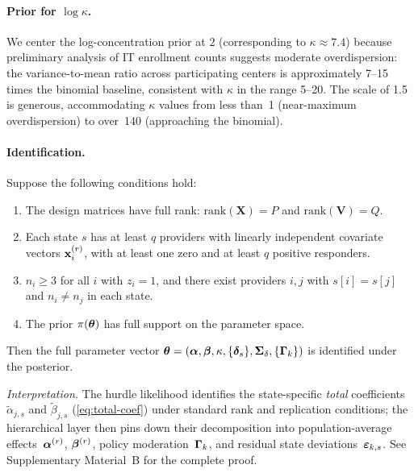 \paragraph{Prior for $\log\kappa$.}
We center the log-concentration prior at $2$ (corresponding to $\kappa \approx 7.4$)
because preliminary analysis of IT enrollment counts suggests moderate
overdispersion: the variance-to-mean ratio across participating centers is
approximately 7--15 times the binomial baseline, consistent with $\kappa$ in the
range 5--20.
The scale of 1.5 is generous, accommodating $\kappa$ values from less than~1
(near-maximum overdispersion) to over~140 (approaching the binomial).

\paragraph{Identification.}
\begin{theorem}[Identification]\label{thm:identification}
  Suppose the following conditions hold:
  \begin{enumerate}[label=\textup{(C\arabic*)},nosep]
    \item The design matrices have full rank:
      $\mathrm{rank}(\mathbf{X}) = P$ and $\mathrm{rank}(\mathbf{V}) = Q$.
    \item Each state $s$ has at least $q$ providers with linearly independent
      covariate vectors $\mathbf{x}_i^{(r)}$, with at least one zero and at least
      $q$ positive responders.
    \item $n_i \ge 3$ for all $i$ with $z_i = 1$, and there exist providers
      $i, j$ with $s[i] = s[j]$ and $n_i \ne n_j$ in each state.
    \item The prior $\pi(\boldsymbol{\theta})$ has full support on the parameter space.
  \end{enumerate}
  Then the full parameter vector $\boldsymbol{\theta} = (\boldsymbol{\alpha}, \boldsymbol{\beta}, \kappa,
  \{\boldsymbol{\delta}_s\}, \boldsymbol{\Sigma}_\delta, \{\boldsymbol{\Gamma}_k\})$ is identified under the
  posterior.
\end{theorem}

\noindent\emph{Interpretation.}
The hurdle likelihood identifies the state-specific \emph{total}
coefficients $\tilde{\alpha}_{j,s}$ and $\tilde{\beta}_{j,s}$
(\cref{eq:total-coef}) under standard rank and replication
conditions; the hierarchical layer then pins down their
decomposition into population-average effects~$\boldsymbol{\alpha}^{(r)}$,
$\boldsymbol{\beta}^{(r)}$, policy moderation~$\boldsymbol{\Gamma}_k$, and residual state
deviations~$\boldsymbol{\varepsilon}_{k,s}$.
See Supplementary Material~B for the complete proof.

